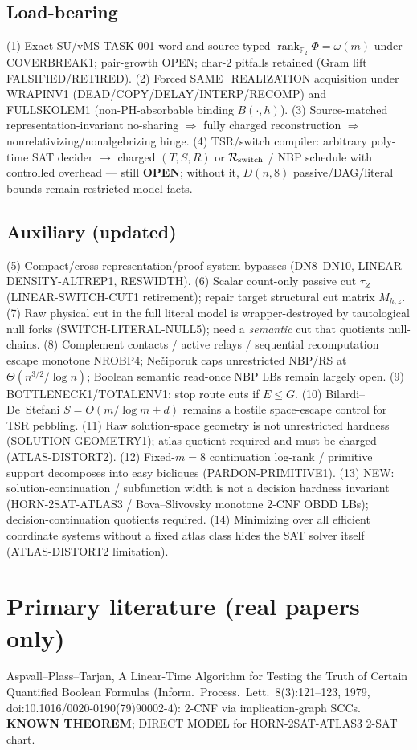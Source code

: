\documentclass[11pt]{article}
\begin{document}
\subsection*{Load-bearing}
(1) Exact SU/vMS TASK-001 word and source-typed
$\operatorname{rank}_{\mathbb F_2}\Phi=\omega(m)$ under COVERBREAK1; pair-growth OPEN;
char-$2$ pitfalls retained (Gram lift FALSIFIED/RETIRED).
(2) Forced SAME\_REALIZATION acquisition under WRAPINV1
(DEAD/COPY/DELAY/INTERP/RECOMP) and FULLSKOLEM1 (non-PH-absorbable binding $B(\cdot,h)$).
(3) Source-matched representation-invariant no-sharing $\Rightarrow$ fully charged reconstruction
$\Rightarrow$ nonrelativizing/nonalgebrizing hinge.
(4) TSR/switch compiler: arbitrary poly-time SAT decider $\to$ charged $(T,S,R)$ or
$\mathcal R_{\rm switch}$ / NBP schedule with controlled overhead --- still \textbf{OPEN};
without it, $D(n,8)$ passive/DAG/literal bounds remain restricted-model facts.

\subsection*{Auxiliary (updated)}
(5) Compact/cross-representation/proof-system bypasses (DN8--DN10, LINEAR-DENSITY-ALTREP1, RESWIDTH).
(6) Scalar count-only passive cut $\tau_Z$ (LINEAR-SWITCH-CUT1 retirement); repair target
structural cut matrix $M_{h,z}$.
(7) Raw physical cut in the full literal model is wrapper-destroyed by tautological
null forks (SWITCH-LITERAL-NULL5); need a \emph{semantic} cut that quotients null-chains.
(8) Complement contacts / active relays / sequential recomputation escape monotone NROBP4;
Ne\v{c}iporuk caps unrestricted NBP/RS at $\Theta(n^{3/2}/\log n)$; Boolean semantic
read-once NBP LBs remain largely open.
(9) BOTTLENECK1/TOTALENV1: stop route cuts if $E\le G$.
(10) Bilardi--De~Stefani $S=O(m/\log m+d)$ remains a hostile space-escape control for TSR pebbling.
(11) Raw solution-space geometry is not unrestricted hardness (SOLUTION-GEOMETRY1);
atlas quotient required and must be charged (ATLAS-DISTORT2).
(12) Fixed-$m=8$ continuation log-rank / primitive support decomposes into easy bicliques
(PARDON-PRIMITIVE1).
(13) NEW: solution-continuation / subfunction width is not a decision hardness invariant
(HORN-2SAT-ATLAS3 / Bova--Slivovsky monotone 2-CNF OBDD LBs); decision-continuation
quotients required.
(14) Minimizing over all efficient coordinate systems without a fixed atlas class
hides the SAT solver itself (ATLAS-DISTORT2 limitation).

\section*{Primary literature (real papers only)}
Aspvall--Plass--Tarjan, A Linear-Time Algorithm for Testing the Truth of Certain
Quantified Boolean Formulas (Inform.\ Process.\ Lett.\ 8(3):121--123, 1979,
doi:10.1016/0020-0190(79)90002-4): 2-CNF via implication-graph SCCs.
\textbf{KNOWN THEOREM}; DIRECT MODEL for HORN-2SAT-ATLAS3 2-SAT chart.
\end{document}
